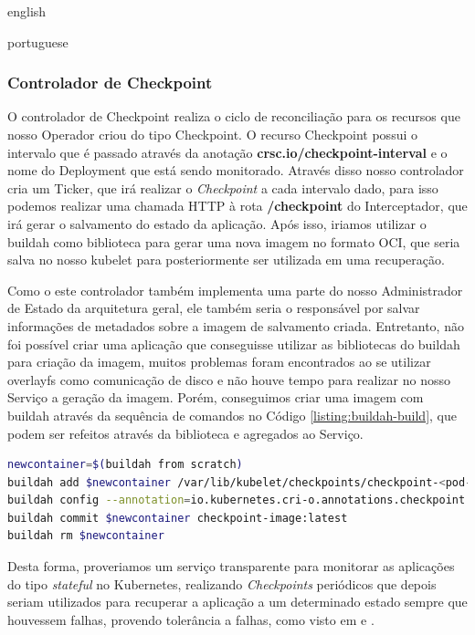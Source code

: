 \begin{otherlanguage*}{english}
\begin{otherlanguage*}{portuguese}
\subsubsection{Controlador de Checkpoint}

O controlador de Checkpoint realiza o ciclo de reconciliação para os recursos que nosso
Operador criou do tipo Checkpoint. O recurso Checkpoint possui o intervalo que é
passado através da anotação \textbf{crsc.io/checkpoint-interval} e o nome do Deployment
que está sendo monitorado. Através disso nosso controlador cria um Ticker, que irá
realizar o \textit{Checkpoint} a cada intervalo dado, para isso podemos realizar uma
chamada HTTP à rota \textbf{/checkpoint} do Interceptador, que irá gerar o salvamento do
estado da aplicação. Após isso, iriamos utilizar o buildah como biblioteca para gerar
uma nova imagem no formato OCI, que seria salva no nosso kubelet para posteriormente ser
utilizada em uma recuperação.

Como o este controlador também implementa uma parte do nosso Administrador de Estado da 
arquitetura geral, ele também seria o responsável por salvar informações de metadados
sobre a imagem de salvamento criada. Entretanto, não foi possível criar uma aplicação
que conseguisse utilizar as bibliotecas do buildah para criação da imagem, muitos
problemas foram encontrados ao se utilizar overlayfs como comunicação de disco e não
houve tempo para realizar no nosso Serviço a geração da imagem. Porém, conseguimos criar
uma imagem com buildah através da sequência de comandos no Código
\ref{listing:buildah-build}, que podem ser refeitos através da biblioteca e agregados ao
Serviço.

\begin{lstlisting}[language=bash,caption={Comandos do buildah para construir a imagem de recuperação a partir de um Checkpoint feito pelo CRIU através do kubelet.},label={listing:buildah-build}]
newcontainer=$(buildah from scratch)
buildah add $newcontainer /var/lib/kubelet/checkpoints/checkpoint-<pod-name>_<namespace-name>-<container-name>-<timestamp>.tar /
buildah config --annotation=io.kubernetes.cri-o.annotations.checkpoint.name=<container-name> $newcontainer
buildah commit $newcontainer checkpoint-image:latest
buildah rm $newcontainer
\end{lstlisting}

Desta forma, proveriamos um serviço transparente para monitorar as aplicações do tipo
\textit{stateful} no Kubernetes, realizando \textit{Checkpoints} periódicos que depois
seriam utilizados para recuperar a aplicação a um determinado estado sempre que houvessem
falhas, provendo tolerância a falhas, como visto em \cite{vayghan2021kubernetes}
\cite{muller2022architecture} \cite{oh2018stateful} e \cite{schmidttransparent}.


\end{otherlanguage*}
\end{otherlanguage*}
